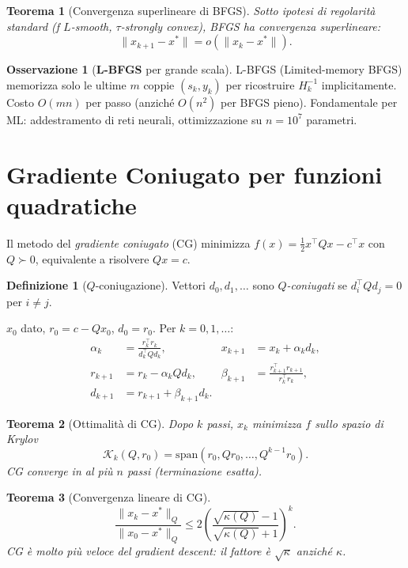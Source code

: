 \documentclass[11pt, a4paper, twoside]{book}
\theoremstyle{definition}
\newtheorem{defn}{Definizione}[chapter]
\newtheorem{remark}{Osservazione}[chapter]
\theoremstyle{plain}
\newtheorem{thm}{Teorema}[chapter]
\theoremstyle{remark}
\begin{document}
\begin{thm}[Convergenza superlineare di BFGS]
Sotto ipotesi di regolarità standard (f $L$-smooth, $\tau$-strongly convex), BFGS ha convergenza \emph{superlineare}:
\[
  \|x_{k+1} - x^*\| = o(\|x_k - x^*\|).
\]
\end{thm}

\begin{remark}[\textbf{L-BFGS} per grande scala]
L-BFGS (Limited-memory BFGS) memorizza solo le ultime $m$ coppie $(s_k, y_k)$ per ricostruire $H_k^{-1}$ implicitamente. Costo $O(mn)$ per passo (anziché $O(n^2)$ per BFGS pieno). Fondamentale per ML: addestramento di reti neurali, ottimizzazione su $n = 10^7$ parametri.
\end{remark}

\section{Gradiente Coniugato per funzioni quadratiche}

Il metodo del \emph{gradiente coniugato} (CG) minimizza $f(x) = \frac{1}{2}x^\top Qx - c^\top x$ con $Q \succ 0$, equivalente a risolvere $Qx = c$.

\begin{defn}[$Q$-coniugazione]
Vettori $d_0, d_1, \ldots$ sono \emph{$Q$-coniugati} se $d_i^\top Q d_j = 0$ per $i \neq j$.
\end{defn}

\begin{algobox}
$x_0$ dato, $r_0 = c - Qx_0$, $d_0 = r_0$. Per $k = 0, 1, \ldots$:
\begin{align*}
  \alpha_k &= \frac{r_k^\top r_k}{d_k^\top Q d_k}, \quad &
  x_{k+1} &= x_k + \alpha_k d_k, \\
  r_{k+1} &= r_k - \alpha_k Q d_k, \quad &
  \beta_{k+1} &= \frac{r_{k+1}^\top r_{k+1}}{r_k^\top r_k}, \\
  d_{k+1} &= r_{k+1} + \beta_{k+1} d_k.&&
\end{align*}
\end{algobox}

\begin{thm}[Ottimalità di CG]
Dopo $k$ passi, $x_k$ minimizza $f$ sullo spazio di Krylov
\[
  \mathcal{K}_k(Q, r_0) = \mathrm{span}(r_0, Qr_0, \ldots, Q^{k-1}r_0).
\]
CG converge in al più $n$ passi (terminazione esatta).
\end{thm}

\begin{thm}[Convergenza lineare di CG]
\[
  \frac{\|x_k - x^*\|_Q}{\|x_0 - x^*\|_Q} \leq 2 \left(\frac{\sqrt{\kappa(Q)} - 1}{\sqrt{\kappa(Q)} + 1}\right)^k.
\]
CG è molto più veloce del gradient descent: il fattore è $\sqrt{\kappa}$ anziché $\kappa$.
\end{thm}
\end{document}
